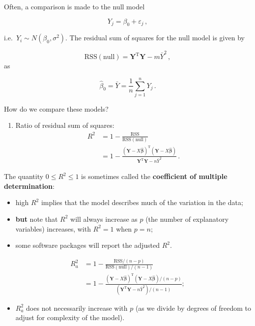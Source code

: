 \documentclass[
]{book}
\providecommand{\tightlist}{%
  \setlength{\itemsep}{0pt}\setlength{\parskip}{0pt}}
\theoremstyle{definition}
\theoremstyle{definition}
\theoremstyle{definition}
\theoremstyle{definition}
\theoremstyle{remark}
\begin{document}
Often, a comparison is made to the null model

\[
Y_{j}=\beta_{0}+\varepsilon_{j}\,,
\]

i.e.~\(Y_{i}\sim N(\beta_{0},\sigma^{2})\). The residual sum of squares for the null model is given by

\[
\textrm{RSS}(\textrm{null}) = \boldsymbol{Y}^{\textrm{T}}\boldsymbol{Y} - m\bar{Y}^{2}\,,
\]
as

\[
\hat{\beta}_{0} = \bar{Y} = \frac{1}{n}\sum_{j=1}^n Y_{j}\,.
\]

How do we compare these models?

\begin{enumerate}
\def\labelenumi{\arabic{enumi}.}
\tightlist
\item
  Ratio of residual sum of squares:
  \begin{align*}
  R^{2} & = 1 - \frac{\textrm{RSS}}{\textrm{RSS}(\textrm{null})} \\
  & = 1 - \frac{(\boldsymbol{Y}-X\hat{\boldsymbol{\beta}})^{\textrm{T}}(\boldsymbol{Y}-X\hat{\boldsymbol{\beta}})}{\boldsymbol{Y}^{\textrm{T}}\boldsymbol{Y}-n\bar{Y}^{2}}\,.
  \end{align*}
\end{enumerate}

The quantity \(0\leq R^{2}\leq 1\) is sometimes called the \textbf{coefficient of multiple determination}:

\begin{itemize}
\tightlist
\item
  high \(R^{2}\) implies that the model describes much of the variation in the data;
\item
  \textbf{but} note that \(R^{2}\) will always increase as \(p\) (the number of explanatory variables) increases, with \(R^{2}=1\) when \(p=n\);
\item
  some software packages will report the adjusted \(R^{2}\).
\end{itemize}

\begin{align*}
R^{2}_{a} & = 1-\frac{\textrm{RSS}/(n-p)}{\textrm{RSS}(\textrm{null})/(n-1)}\\
& = 1 - \frac{(\boldsymbol{Y} - X\hat{\boldsymbol{\beta}})^{\textrm{T}} (\boldsymbol{Y} - X\hat{\boldsymbol{\beta}})/(n-p)}{(\boldsymbol{Y}^{\textrm{T}}\boldsymbol{Y} - n\bar{Y}^{2})/(n-1)};
\end{align*}

\begin{itemize}
\tightlist
\item
  \(R_a^2\) does not necessarily increase with \(p\) (as we divide by degrees of freedom to adjust for complexity of the model).
\end{itemize}
\end{document}
